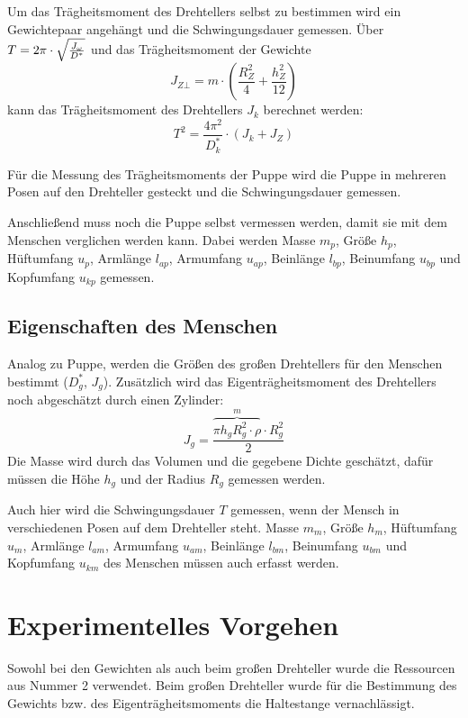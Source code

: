 \documentclass[a4paper, 11pt, ngerman]{scrartcl}
\begin{document}
Um das Trägheitsmoment des Drehtellers selbst zu bestimmen wird ein Gewichtepaar angehängt und die Schwingungsdauer gemessen. Über $T = 2\pi \cdot \sqrt{J_\omega \over D^*}$ und das Trägheitsmoment der Gewichte
\begin{equation}\label{equ:TraegheitsmomentZylinderBot}
J_{Z\bot} = m \cdot \left(\frac{R_Z^2}{4} + \frac{h_Z^2}{12}\right)
\end{equation}
kann das Trägheitsmoment des Drehtellers $J_k$ berechnet werden:
\begin{equation}\label{equ:Traegheitsmoment}
T^2 = \frac{4\pi^2}{D^*_k} \cdot (J_k + J_Z)
\end{equation}

Für die Messung des Trägheitsmoments der Puppe wird die Puppe in mehreren Posen auf den Drehteller gesteckt und die Schwingungsdauer gemessen.

Anschließend muss noch die Puppe selbst vermessen werden, damit sie mit dem Menschen verglichen werden kann. Dabei werden Masse $m_p$, Größe $h_p$, Hüftumfang $u_p$, Armlänge $l_{ap}$, Armumfang $u_{ap}$, Beinlänge $l_{bp}$, Beinumfang $u_{bp}$ und Kopfumfang $u_{kp}$ gemessen.

\subsection{Eigenschaften des Menschen}
Analog zu Puppe, werden die Größen des großen Drehtellers für den Menschen bestimmt ($D^*_g$, $J_g$). Zusätzlich wird das Eigenträgheitsmoment des Drehtellers noch abgeschätzt durch einen Zylinder:
\begin{equation}\label{equ:TraegheitsmomentZylinder}
J_g = \frac{\overbrace{\pi h_g R_g^2 \cdot \rho}^m \cdot  R_g^2}{2}
\end{equation}
Die Masse wird durch das Volumen und die gegebene Dichte geschätzt, dafür müssen die Höhe $h_g$ und der Radius $R_g$ gemessen werden.

Auch hier wird die Schwingungsdauer $T$ gemessen, wenn der Mensch in verschiedenen Posen auf dem Drehteller steht. Masse $m_m$, Größe $h_m$, Hüftumfang $u_m$, Armlänge $l_{am}$, Armumfang $u_{am}$, Beinlänge $l_{bm}$, Beinumfang $u_{bm}$ und Kopfumfang $u_{km}$ des Menschen müssen auch erfasst werden.

\section{Experimentelles Vorgehen}
Sowohl bei den Gewichten als auch beim großen Drehteller wurde die Ressourcen aus Nummer 2 verwendet. Beim großen Drehteller wurde für die Bestimmung des Gewichts bzw. des Eigenträgheitsmoments die Haltestange vernachlässigt.
\end{document}
